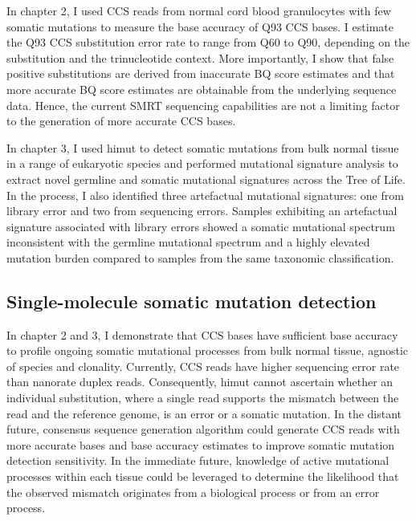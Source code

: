 In chapter 2, I used CCS reads from normal cord blood granulocytes with few somatic mutations to measure the base accuracy of Q93 CCS bases. I estimate the Q93 CCS substitution error rate to range from Q60 to Q90, depending on the substitution and the trinucleotide context. More importantly, I show that false positive substitutions are derived from inaccurate BQ score estimates and that more accurate BQ score estimates are obtainable from the underlying sequence data. Hence, the current SMRT sequencing capabilities are not a limiting factor to the generation of more accurate CCS bases. 


In chapter 3, I used himut to detect somatic mutations from bulk normal tissue in a range of eukaryotic species and performed mutational signature analysis to extract novel germline and somatic mutational signatures across the Tree of Life. In the process, I also identified three artefactual mutational signatures: one from library error and two from sequencing errors. Samples exhibiting an artefactual signature associated with library errors showed a somatic mutational spectrum inconsistent with the germline mutational spectrum and a highly elevated mutation burden compared to samples from the same taxonomic classification. 

\subsection{Single-molecule somatic mutation detection}

In chapter 2 and 3, I demonstrate that CCS bases have sufficient base accuracy to profile ongoing somatic mutational processes from bulk normal tissue, agnostic of species and clonality. Currently, CCS reads have higher sequencing error rate than nanorate duplex reads. Consequently, himut cannot ascertain whether an individual substitution, where a single read supports the mismatch between the read and the reference genome, is an error or a somatic mutation. In the distant future, consensus sequence generation algorithm could generate CCS reads with more accurate bases and base accuracy estimates to improve somatic mutation detection sensitivity. In the immediate future, knowledge of active mutational processes within each tissue could be leveraged to determine the likelihood that the observed mismatch originates from a biological process or from an error process.

